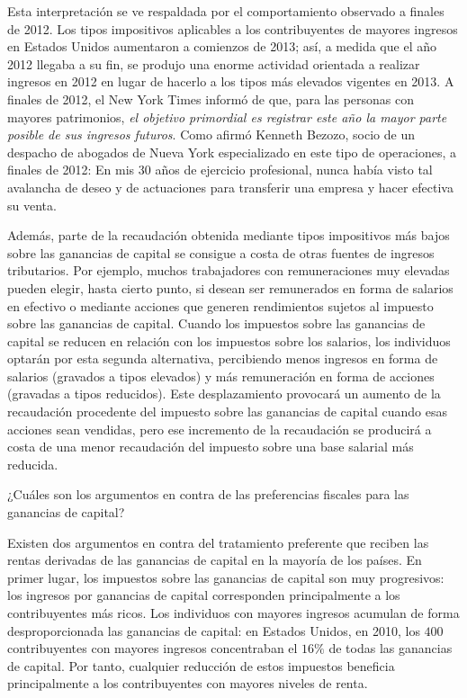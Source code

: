\documentclass[10pt,a4paper]{article}
\begin{document}
Esta interpretación se ve respaldada por el comportamiento observado a finales de 2012. Los tipos impositivos aplicables a los contribuyentes de mayores ingresos en Estados Unidos aumentaron a comienzos de 2013; así, a medida que el año 2012 llegaba a su fin, se produjo una enorme actividad orientada a realizar ingresos en 2012 en lugar de hacerlo a los tipos más elevados vigentes en 2013. A finales de 2012, el New York Times informó de que, para las personas con mayores patrimonios, \textit{el objetivo primordial es registrar este año la mayor parte posible de sus ingresos futuros}. Como afirmó Kenneth Bezozo, socio de un despacho de abogados de Nueva York especializado en este tipo de operaciones, a finales de 2012: En mis 30 años de ejercicio profesional, nunca había visto tal avalancha de deseo y de actuaciones para transferir una empresa y hacer efectiva su venta.

Además, parte de la recaudación obtenida mediante tipos impositivos más bajos sobre las ganancias de capital se consigue a costa de otras fuentes de ingresos tributarios. Por ejemplo, muchos trabajadores con remuneraciones muy elevadas pueden elegir, hasta cierto punto, si desean ser remunerados en forma de salarios en efectivo o mediante acciones que generen rendimientos sujetos al impuesto sobre las ganancias de capital. Cuando los impuestos sobre las ganancias de capital se reducen en relación con los impuestos sobre los salarios, los individuos optarán por esta segunda alternativa, percibiendo menos ingresos en forma de salarios (gravados a tipos elevados) y más remuneración en forma de acciones (gravadas a tipos reducidos). Este desplazamiento provocará un aumento de la recaudación procedente del impuesto sobre las ganancias de capital cuando esas acciones sean vendidas, pero ese incremento de la recaudación se producirá a costa de una menor recaudación del impuesto sobre una base salarial más reducida.

¿Cuáles son los argumentos en contra de las preferencias fiscales para las ganancias de capital?

Existen dos argumentos en contra del tratamiento preferente que reciben las rentas derivadas de las ganancias de capital en la mayoría de los países. En primer lugar, los impuestos sobre las ganancias de capital son muy progresivos: los ingresos por ganancias de capital corresponden principalmente a los contribuyentes más ricos. Los individuos con mayores ingresos acumulan de forma desproporcionada las ganancias de capital: en Estados Unidos, en 2010, los $400$ contribuyentes con mayores ingresos concentraban el $16\%$ de todas las ganancias de capital. Por tanto, cualquier reducción de estos impuestos beneficia principalmente a los contribuyentes con mayores niveles de renta.
\end{document}
